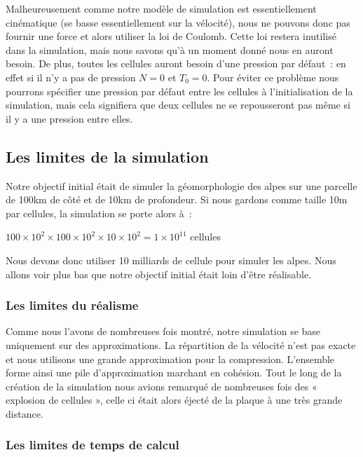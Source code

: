 \documentclass[a4paper,11pt]{article}
\begin{document}
Malheureusement comme notre modèle de simulation est essentiellement cinématique (se basse essentiellement sur la vélocité), nous ne pouvons donc pas fournir une force et alors utiliser la loi de Coulomb.
Cette loi restera inutilisé dans la simulation, mais nous savons qu'à un moment donné nous en auront besoin.
De plus, toutes les cellules auront besoin d'une pression par défaut~: en effet si il n'y a pas de pression $N = 0$ et $T_0 = 0$.
Pour éviter ce problème nous pourrons spécifier une pression par défaut entre les cellules à l'initialisation de la simulation, mais cela signifiera que deux cellules ne se repousseront pas même si il y a une pression entre elles. 

\subsection{Les limites de la simulation}

Notre objectif initial était de simuler la géomorphologie des alpes sur une parcelle de 100km de côté et de 10km de profondeur.
Si nous gardons comme taille 10m par cellules, la simulation se porte alors à~:
\begin{center}
  $100 \times 10^2 \times 100 \times 10^2 \times 10 \times 10^2 = 1 \times 10^{11}$ cellules
\end{center}
Nous devons donc utiliser 10 milliards de cellule pour simuler les alpes.
Nous allons voir plus bas que notre objectif initial était loin d'être réalisable.

\subsubsection{Les limites du réalisme}

Comme nous l'avons de nombreuses fois montré, notre simulation se base uniquement sur des approximations.
La répartition de la vélocité n'est pas exacte et nous utilisons une grande approximation pour la compression.
L'ensemble forme ainsi une pile d'approximation marchant en cohésion.
Tout le long de la création de la simulation nous avions remarqué de nombreuses fois des « explosion de cellules », celle ci était alors éjecté de la plaque à une très grande distance.

\subsubsection{Les limites de temps de calcul}

\begin{center}
\end{center}
\end{document}
